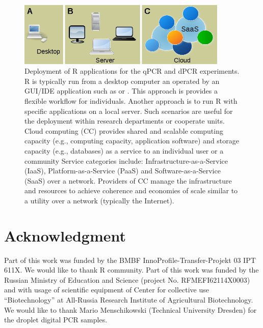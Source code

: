 \begin{figure}[htbp]
  \centering
  \includegraphics[clip=true, width=10cm]{figures/options.png}
  \caption{Deployment of R applications for the qPCR and dPCR experiments. 
 R is typically run from a desktop computer an operated by an 
GUI/IDE application such as  or . This approach is 
provides a flexible workflow for individuals.  Another approach is 
to run R with specific applications on a local server. Such scenarios are 
useful 
for the deployment within research departments or cooperate units.  
Cloud computing (CC) provides shared and scalable computing capacity (e.g., 
computing capacity, application software) and storage capacity (e.g., 
databases) 
as a service to an individual user or a community Service categories include: 
Infrastructure-as-a-Service (IaaS), Platform-as-a-Service (PaaS) and 
Software-as-a-Service (SaaS) over a network. Providers of CC manage the 
infrastructure and resources to achieve coherence and economies of scale 
similar 
to a utility over a network (typically the Internet).}
  \label{figure:options}
\end{figure} 

\section{Acknowledgment}

Part of this work was funded by the BMBF InnoProfile-Transfer-Projekt 03 IPT 
611X. We would like to thank R community. Part of this work was funded by the 
Russian Ministry of Education and Science (project No. RFMEFI62114X0003) and 
with usage of scientific equipment of Center for collective use 
``Biotechnology'' at All-Russia Research Institute of Agricultural 
Biotechnology. We would like to thank Mario Menschikowski (Technical University 
Dresden) for the droplet digital PCR samples.



\address{Stefan R\"odiger (corresponding author)\\
  Faculty of Natural Sciences\\
  Brandenburg University of Technology Cottbus--Senftenberg\\
  Senftenberg\\
  Germany}

